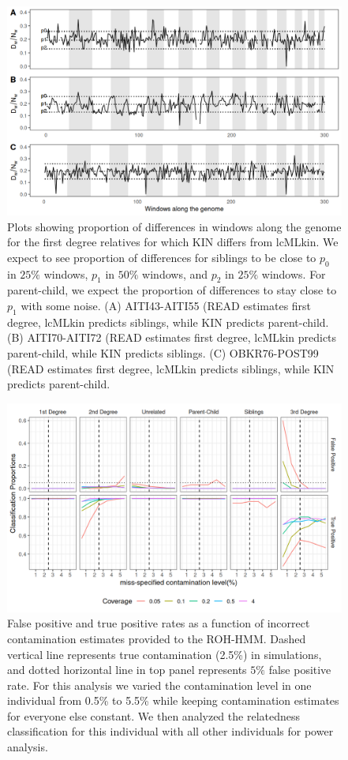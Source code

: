 \documentclass[12pt, letterpaper]{article}
\begin{document}
\begin{figure}[h]
    \centering
    \includegraphics[width=18cm]{supplementary_info/plots/egplot2.png}
    \caption{Plots showing proportion of differences in windows along the genome for the first degree relatives for which KIN differs from lcMLkin. We expect to see proportion of differences for siblings to be close to $p_0$ in $25\%$ windows, $p_1$ in $50\%$ windows, and $p_2$ in $25\%$ windows. For parent-child, we expect the proportion of differences to stay close to $p_1$ with some noise. (A) AITI43-AITI55 (READ estimates first degree, lcMLkin predicts siblings, while KIN predicts parent-child. (B) AITI70-AITI72 (READ estimates first degree, lcMLkin predicts parent-child, while KIN predicts siblings. (C) OBKR76-POST99 (READ estimates first degree, lcMLkin predicts siblings, while KIN predicts parent-child.}
    \label{figS9:eg2}
\end{figure}

\begin{figure}[h]
    \centering
    \includegraphics[width=18cm]{supplementary_info/plots/contam_missspecification.png}
    \caption{False positive and true positive rates as a function of incorrect contamination estimates provided to the ROH-HMM. Dashed vertical line represents true contamination (2.5\%) in simulations, and dotted horizontal line in top panel represents $5\%$ false positive rate. For this analysis we varied the contamination level in one individual from 0.5\% to 5.5\% while keeping contamination estimates for everyone else constant. We then analyzed the relatedness classification for this individual with all other individuals for power analysis.}
    \label{figS10:cnt}
\end{figure}
\end{document}
